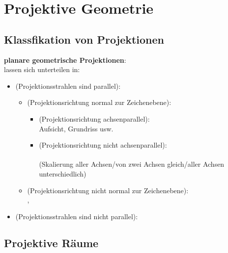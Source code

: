 \section{%
    Projektive Geometrie%
}

\subsection{%
    Klassfikation von Projektionen%
}

\textbf{planare geometrische Projektionen}:\\
 lassen sich unterteilen in:
\begin{itemize}
    \item
     (Projektionsstrahlen sind parallel):
    \begin{itemize}
        \item
         (Projektionsrichtung normal zur Zeichenebene):
        \begin{itemize}
            \item
             (Projektionsrichtung achsenparallel):\\
            Aufsicht, Grundriss usw.

            \item
            (Projektionsrichtung nicht achsenparallel):\\
            \\
            (Skalierung aller Achsen/von zwei Achsen gleich/aller Achsen unterschiedlich)
        \end{itemize}

        \item
         (Projektionsrichtung nicht normal zur Zeichenebene):\\
        , 
    \end{itemize}

    \item
     (Projektionsstrahlen sind nicht parallel):\\
\end{itemize}

\subsection{%
    Projektive Räume%
}

